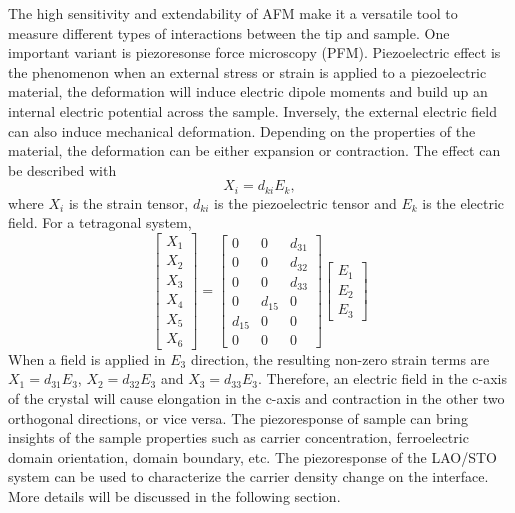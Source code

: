 \documentclass[pdflatex, sectionletters, 12pt]{pittetd}    %
\begin{document}
The high sensitivity and extendability of AFM make it a versatile tool to measure different types of interactions between the tip and sample. One important variant is piezoresonse force microscopy (PFM). Piezoelectric effect is the phenomenon when an external stress or strain is applied to a piezoelectric material, the deformation will induce electric dipole moments and build up an internal electric potential across the sample. Inversely, the external electric field can also induce mechanical deformation. Depending on the properties of the material, the deformation can be either expansion or contraction. The effect can be described with
$$
X_i = d_{ki}E_k,
$$
where $X_i$ is the strain tensor, $d_{ki}$ is the piezoelectric tensor and $E_k$ is the electric field. For a tetragonal system, 
$$
\begin{bmatrix}
X_{1} \\
X_{2} \\
X_{3} \\
X_{4} \\
X_{5} \\
X_{6}
\end{bmatrix} =
\begin{bmatrix}
0 & 0 & d_{31} \\
0 & 0 & d_{32} \\
0 & 0 & d_{33} \\
0 & d_{15} & 0 \\
d_{15} & 0 & 0 \\
0 & 0 & 0
\end{bmatrix}
\begin{bmatrix}
E_{1} \\
E_{2} \\
E_{3}
\end{bmatrix}
$$
When a field is applied in $E_3$ direction, the resulting non-zero strain terms are $X_1 = d_{31}E_3$, $X_2 = d_{32}E_3$ and $X_3 = d_{33}E_3$. Therefore, an electric field in the c-axis of the crystal will cause elongation in the c-axis and contraction in the other two orthogonal directions, or vice versa. The piezoresponse of sample can bring insights of the sample properties such as carrier concentration\cite{}, ferroelectric domain orientation\cite{}, domain boundary\cite{}, etc. The piezoresponse of the LAO/STO system can be used to characterize the carrier density change on the interface. More details will be discussed in the following section.
\end{document}
